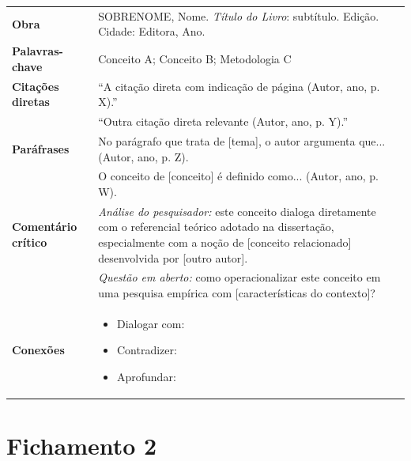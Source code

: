 \documentclass[
  12pt,
  a4paper,
  brazilian
]{article}
\begin{document}
\begin{longtable}{p{3cm} p{12cm}}
\toprule
\textbf{Obra} & SOBRENOME, Nome. \textit{Título do Livro}: subtítulo.
               Edição. Cidade: Editora, Ano. \\
\textbf{Palavras-chave} & Conceito A; Conceito B; Metodologia C \\
\midrule
\textbf{Citações diretas} &
  ``A citação direta com indicação de página (Autor, ano, p. X).'' \\
&
  ``Outra citação direta relevante (Autor, ano, p. Y).'' \\
\midrule
\textbf{Paráfrases} &
  No parágrafo que trata de [tema], o autor argumenta que... (Autor, ano, p. Z). \\
&
  O conceito de [conceito] é definido como... (Autor, ano, p. W). \\
\midrule
\textbf{Comentário crítico} &
  \textit{Análise do pesquisador:} este conceito dialoga diretamente
  com o referencial teórico adotado na dissertação, especialmente com
  a noção de [conceito relacionado] desenvolvida por [outro autor]. \\
&
  \textit{Questão em aberto:} como operacionalizar este conceito em
  uma pesquisa empírica com [características do contexto]? \\
\midrule
\textbf{Conexões} &
  \begin{itemize}[nosep]
    \item Dialogar com: \cite{autor2023}
    \item Contradizer: \cite{autor2021}
    \item Aprofundar: \cite{autor2020}
  \end{itemize} \\
\bottomrule
\end{longtable}

\newpage

\section*{Fichamento 2}
\end{document}
